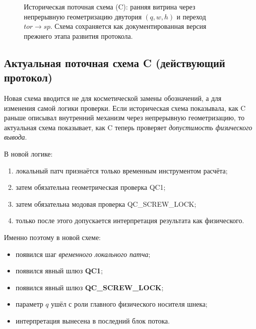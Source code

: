 \begin{figure}[p]
{%
}
\caption{Историческая поточная схема (C): ранняя витрина через непрерывную геометризацию двутория $(q,w,h)$ и переход $tor\to sp$. Схема сохраняется как документированная версия прежнего этапа развития протокола.}
\label{fig:C_flow_tikz_old}
\end{figure}

\subsection{Актуальная поточная схема C (действующий протокол)}

Новая схема вводится не для косметической замены обозначений, а для изменения самой логики проверки.
Если историческая схема показывала, как C раньше описывал внутренний механизм через непрерывную геометризацию,
то актуальная схема показывает, как C теперь проверяет \emph{допустимость физического вывода}.

В новой логике:
\begin{enumerate}
\item локальный патч признаётся только временным инструментом расчёта;
\item затем обязательна геометрическая проверка QC1;
\item затем обязательна модовая проверка QC\_SCREW\_LOCK;
\item только после этого допускается интерпретация результата как физического.
\end{enumerate}

Именно поэтому в новой схеме:
\begin{itemize}
\item появился шаг \emph{временного локального патча};
\item появился явный шлюз \textbf{QC1};
\item появился явный шлюз \textbf{QC\_SCREW\_LOCK};
\item параметр $q$ ушёл с роли главного физического носителя шнека;
\item интерпретация вынесена в последний блок потока.
\end{itemize}

